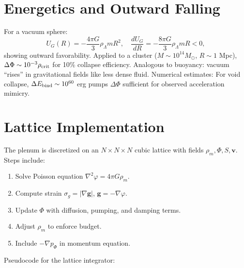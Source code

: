 \documentclass[11pt]{article}
\theoremstyle{plain}
\theoremstyle{definition}
\begin{document}
\section{Energetics and Outward Falling}
For a vacuum sphere:
\begin{equation}
U_G(R) = -\frac{4\pi G}{3} \rho_\Lambda m R^2, \quad \frac{dU_G}{dR} = -\frac{8\pi G}{3} \rho_\Lambda m R < 0,
\end{equation}
showing outward favorability. Applied to a cluster ($M \sim 10^{14} M_\odot$, $R \sim 1$ Mpc), $\Delta \Phi \sim 10^{-3} \rho_{\rm crit}$ for 10\% collapse efficiency.
Analogous to buoyancy: vacuum ``rises'' in gravitational fields like less dense fluid. Numerical estimates: For void collapse, $\Delta E_{\rm bind} \sim 10^{60}$ erg pumps $\Delta \Phi$ sufficient for observed acceleration mimicry.
\section{Lattice Implementation}
The plenum is discretized on an $N \times N \times N$ cubic lattice with fields $\rho_m, \Phi, S, \bm{v}$. Steps include:
\begin{enumerate}
    \item Solve Poisson equation $\nabla^2 \varphi = 4\pi G \rho_m$.
    \item Compute strain $\sigma_g = |\nabla \bm{g}|$, $\bm{g} = -\nabla \varphi$.
    \item Update $\Phi$ with diffusion, pumping, and damping terms.
    \item Adjust $\rho_m$ to enforce budget.
    \item Include $-\nabla p_\Phi$ in momentum equation.
\end{enumerate}
Pseudocode for the lattice integrator:
\end{document}
